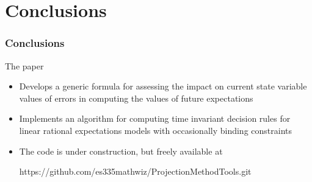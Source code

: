 \documentclass{beamer}
\begin{document}





    \section{Conclusions}

  \begin{frame}
    \frametitle{Conclusions}

The paper 

    \begin{itemize}
\item Develops a generic formula  for assessing the impact on current state variable values of errors in computing the values of future expectations
    \item Implements an algorithm for computing time invariant 
decision rules for linear rational expectations models with occasionally binding constraints
\item The code is under construction, but freely available at 

https://github.com/es335mathwiz/ProjectionMethodTools.git
    \end{itemize}
  \end{frame}
\end{document}
